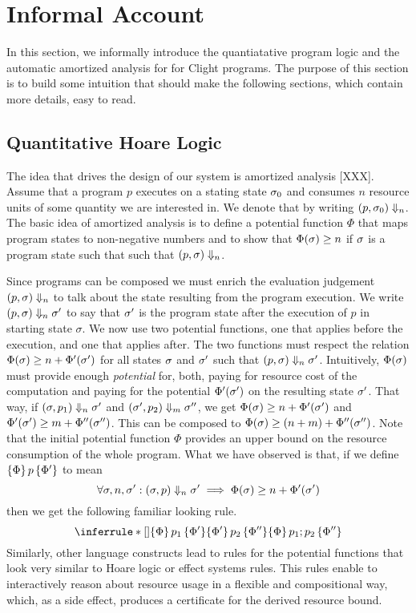 \documentclass[nocopyrightspace,preprint]{sigplanconf}
\begin{document}
\section{Informal Account}
\label{sec:inform}

In this section, we informally introduce the quantiatative program
logic and the automatic amortized analysis for for Clight programs.
The purpose of this section is to build some intuition that should
make the following sections, which contain more details, easy to read.

\subsection{Quantitative Hoare Logic}

The idea that drives the design of our system is amortized analysis
[XXX].  Assume that a program $p$ executes on a stating state
$\sigma_0$ and consumes $n$ resource units of some quantity we are
interested in.  We denote that by writing $(p, \sigma_0)
\Downarrow_n$.  The basic idea of amortized analysis is to define a
potential function $\Phi$ that maps program states to non-negative
numbers and to show that $\Phi(\sigma) \geq n$ if $\sigma$ is a
program state such that such that $(p, \sigma) \Downarrow_n$.

Since programs can be composed we must enrich the evaluation judgement
$(p, \sigma) \Downarrow_{n}$ to talk about the state resulting from
the program execution.  We write $(p, \sigma) \Downarrow_n \sigma'$ to
say that $\sigma'$ is the program state after the execution of $p$ in
starting state $\sigma$.  We now use two potential functions, one that
applies before the execution, and one that applies after.  The two
functions must respect the relation $\Phi(\sigma) \ge n +
\Phi'(\sigma')$ for all states $\sigma$ and $\sigma'$ such that $(p,
\sigma) \Downarrow_n \sigma'$.  Intuitively, $\Phi(\sigma)$ must
provide enough \emph{potential} for, both, paying for resource cost of
the computation and paying for the potential $\Phi'(\sigma')$ on the
resulting state $\sigma'$. That way, if $(\sigma, p_1) \Downarrow_n
\sigma'$ and $(\sigma', p_2) \Downarrow_m \sigma''$, we get
$\Phi(\sigma) \ge n + \Phi'(\sigma')$ and $\Phi'(\sigma') \ge m +
\Phi''(\sigma'')$.  This can be composed to $\Phi(\sigma) \ge (n + m)
+ \Phi''(\sigma'')$.  Note that the initial potential function $\Phi$
provides an upper bound on the resource consumption of the whole
program.  What we have observed is that, if we define $\{\Phi\}\, p\, \{\Phi'\}$ to mean
$$
\forall \sigma, n, \sigma' : (\sigma, p) \Downarrow_n \sigma' \implies \Phi(\sigma) \ge
n + \Phi'(\sigma')
$$
then we get the following familiar looking rule.
$$
\RuleNolabel
{\htriple{\Phi}{p_1}{\Phi'} \\ \htriple{\Phi'}{p_2}{\Phi''}}
{\htriple{\Phi} {p_1; p_2}  {\Phi''}}
$$
%
Similarly, other language constructs lead to rules for the potential
functions that look very similar to Hoare logic or effect systems
rules.  This rules enable to interactively reason about resource usage
in a flexible and compositional way, which, as a side effect, produces
a certificate for the derived resource bound.
\end{document}

